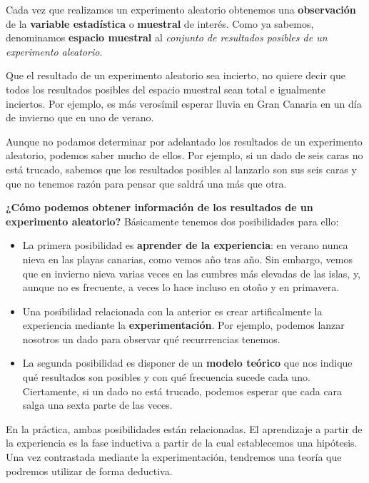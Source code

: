 \documentclass[11pt]{article}
\providecommand{\tightlist}{%
      \setlength{\itemsep}{0pt}\setlength{\parskip}{0pt}}
\begin{document}
    Cada vez que realizamos un experimento aleatorio obtenemos una
\textbf{observación} de la \textbf{variable estadística} o
\textbf{muestral} de interés. Como ya sabemos, denominamos
\textbf{espacio muestral} al \emph{conjunto de resultados posibles de un
experimento aleatorio}.

Que el resultado de un experimento aleatorio sea incierto, no quiere
decir que todos los resultados posibles del espacio muestral sean total
e igualmente inciertos. Por ejemplo, es más verosímil esperar lluvia en
Gran Canaria en un día de invierno que en uno de verano.

Aunque no podamos determinar por adelantado los resultados de un
experimento aleatorio, podemos saber mucho de ellos. Por ejemplo, si un
dado de seis caras no está trucado, sabemos que los resultados posibles
al lanzarlo son sus seis caras y que no tenemos razón para pensar que
saldrá una más que otra.

    \textbf{¿Cómo podemos obtener información de los resultados de un
experimento aleatorio?} Básicamente tenemos dos posibilidades para ello:

\begin{itemize}
\tightlist
\item
  La primera posibilidad es \textbf{aprender de la experiencia}: en
  verano nunca nieva en las playas canarias, como vemos año tras año.
  Sin embargo, vemos que en invierno nieva varias veces en las cumbres
  más elevadas de las islas, y, aunque no es frecuente, a veces lo hace
  incluso en otoño y en primavera.
\item
  Una posibilidad relacionada con la anterior es crear artificalmente la
  experiencia mediante la \textbf{experimentación}. Por ejemplo, podemos
  lanzar nosotros un dado para observar qué recurrrencias tenemos.
\item
  La segunda posibilidad es disponer de un \textbf{modelo teórico} que
  nos indique qué resultados son posibles y con qué frecuencia sucede
  cada uno. Ciertamente, si un dado no está trucado, podemos esperar que
  cada cara salga una sexta parte de las veces.
\end{itemize}

En la práctica, ambas posibilidades están relacionadas. El aprendizaje a
partir de la experiencia es la fase inductiva a partir de la cual
establecemos una hipótesis. Una vez contrastada mediante la
experimentación, tendremos una teoría que podremos utilizar de forma
deductiva.
\end{document}

